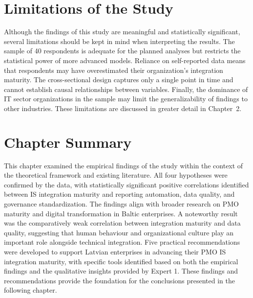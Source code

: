 \section{Limitations of the Study}
\label{sec:study-limitations}

Although the findings of this study are meaningful and statistically
significant, several limitations should be kept in mind when
interpreting the results. The sample of 40 respondents is adequate
for the planned analyses but restricts the statistical power of more
advanced models. Reliance on self-reported data means that respondents
may have overestimated their organization's integration maturity. The
cross-sectional design captures only a single point in time and cannot
establish causal relationships between variables. Finally, the
dominance of IT sector organizations in the sample may limit the
generalizability of findings to other industries. These limitations
are discussed in greater detail in Chapter~2.

\section{Chapter Summary}
\label{sec:chap4summary}

This chapter examined the empirical findings of the study within the
context of the theoretical framework and existing literature. All four
hypotheses were confirmed by the data, with statistically significant
positive correlations identified between IS integration maturity and
reporting automation, data quality, and governance standardization.
The findings align with broader research on PMO maturity and digital
transformation in Baltic enterprises. A noteworthy result was the
comparatively weak correlation between integration maturity and data
quality, suggesting that human behaviour and organizational culture
play an important role alongside technical integration. Five practical
recommendations were developed to support Latvian enterprises in
advancing their PMO IS integration maturity, with specific tools
identified based on both the empirical findings and the qualitative
insights provided by Expert 1. These findings and recommendations
provide the foundation for the conclusions presented in the following
chapter.
